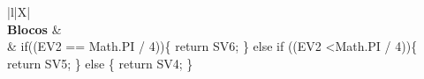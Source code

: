 \begin{xltabular}{\textwidth}{|l|X|}
		 \\ \hline
		\textbf{Blocos} &  \\ \hline
		 & if((EV2 == Math.PI / 4))\{   return SV6; \} else if ((EV2 \textless Math.PI / 4))\{   return SV5; \} else \{   return SV4; \} \\ \hline


\end{xltabular}
